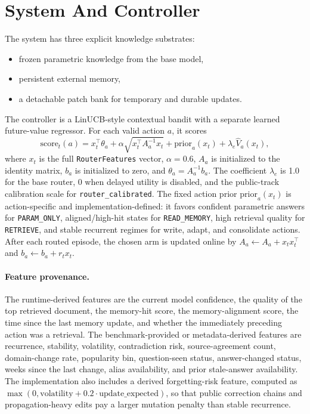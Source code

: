 \section{System And Controller}

The system has three explicit knowledge substrates:
\begin{itemize}[leftmargin=1.5em]
\item frozen parametric knowledge from the base model,
\item persistent external memory,
\item a detachable patch bank for temporary and durable updates.
\end{itemize}

The controller is a LinUCB-style contextual bandit with a separate learned future-value regressor. For each valid action $a$, it scores
\[
\mathrm{score}_t(a) = x_t^\top \theta_a + \alpha \sqrt{x_t^\top A_a^{-1} x_t} + \mathrm{prior}_a(x_t) + \lambda_e \hat V_a(x_t),
\]
where $x_t$ is the full \texttt{RouterFeatures} vector, $\alpha = 0.6$, $A_a$ is initialized to the identity matrix, $b_a$ is initialized to zero, and $\theta_a = A_a^{-1} b_a$. The coefficient $\lambda_e$ is 1.0 for the base router, 0 when delayed utility is disabled, and the public-track calibration scale for \texttt{router\_calibrated}. The fixed action prior $\mathrm{prior}_a(x_t)$ is action-specific and implementation-defined: it favors confident parametric answers for \texttt{PARAM\_ONLY}, aligned/high-hit states for \texttt{READ\_MEMORY}, high retrieval quality for \texttt{RETRIEVE}, and stable recurrent regimes for write, adapt, and consolidate actions. After each routed episode, the chosen arm is updated online by $A_a \leftarrow A_a + x_t x_t^\top$ and $b_a \leftarrow b_a + r_t x_t$.

\paragraph{Feature provenance.}
The runtime-derived features are the current model confidence, the quality of the top retrieved document, the memory-hit score, the memory-alignment score, the time since the last memory update, and whether the immediately preceding action was a retrieval. The benchmark-provided or metadata-derived features are recurrence, stability, volatility, contradiction risk, source-agreement count, domain-change rate, popularity bin, question-seen status, answer-changed status, weeks since the last change, alias availability, and prior stale-answer availability. The implementation also includes a derived forgetting-risk feature, computed as $\max(0, \text{volatility} + 0.2 \cdot \text{update\_expected})$, so that public correction chains and propagation-heavy edits pay a larger mutation penalty than stable recurrence.

